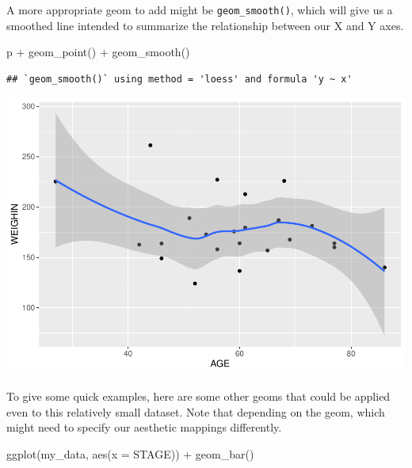 \documentclass[
]{book}
\newenvironment{Shaded}{\begin{snugshade}}{\end{snugshade}}
\newcommand{\AttributeTok}[1]{\textcolor[rgb]{0.77,0.63,0.00}{#1}}
\newcommand{\FunctionTok}[1]{\textcolor[rgb]{0.00,0.00,0.00}{#1}}
\newcommand{\NormalTok}[1]{#1}
\newcommand{\SpecialCharTok}[1]{\textcolor[rgb]{0.00,0.00,0.00}{#1}}
\begin{document}
A more appropriate geom to add might be \texttt{geom\_smooth()}, which will give us a smoothed line intended to summarize the relationship between our X and Y axes.

\begin{Shaded}
\begin{Highlighting}[]
\NormalTok{p }\SpecialCharTok{+}
  \FunctionTok{geom\_point}\NormalTok{() }\SpecialCharTok{+}
  \FunctionTok{geom\_smooth}\NormalTok{()}
\end{Highlighting}
\end{Shaded}

\begin{verbatim}
## `geom_smooth()` using method = 'loess' and formula 'y ~ x'
\end{verbatim}

\includegraphics{_main_files/figure-latex/unnamed-chunk-91-1.pdf}

To give some quick examples, here are some other geoms that could be applied even to this relatively small dataset. Note that depending on the geom, which might need to specify our aesthetic mappings differently.

\begin{Shaded}
\begin{Highlighting}[]
\FunctionTok{ggplot}\NormalTok{(my\_data, }\FunctionTok{aes}\NormalTok{(}\AttributeTok{x =}\NormalTok{ STAGE)) }\SpecialCharTok{+}
  \FunctionTok{geom\_bar}\NormalTok{()}
\end{Highlighting}
\end{Shaded}
\end{document}
